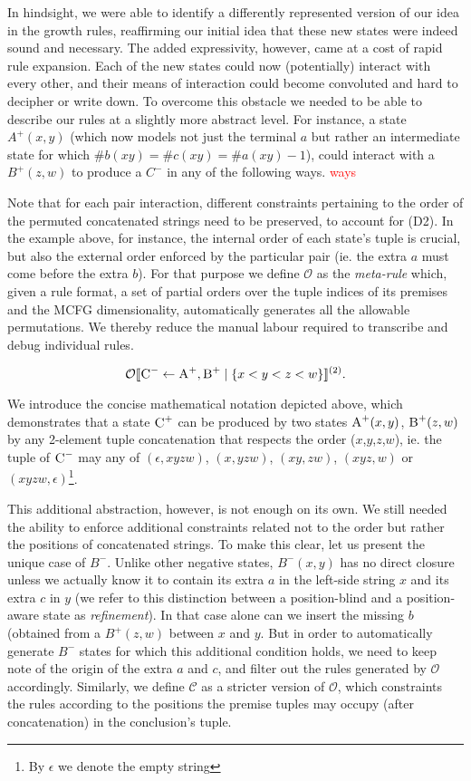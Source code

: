 \documentclass[nonatbib,numbers,10pt]{sigplanconf}
\newcommand\todo[1]{\textcolor{red}{#1}}
\newcommand\s{\textsc}
\newcommand{\Order}[5]{
	\[
	\mathcal{#1}\llbracket #2 \leftarrow #3 \mid \{ #4 \} \rrbracket^{(#5)}.
	\]
}
\newcommand{\Ord}[4]{\Order{O}{#1}{#2}{#3}{#4}}
\begin{document}
In hindsight, we were able to identify a differently represented version of our idea in the growth rules, reaffirming our initial idea that these new states were indeed sound and necessary. The added expressivity, however, came at a cost of rapid rule expansion. Each of the new states could now (potentially) interact with every other, and their means of interaction could become convoluted and hard to decipher or write down. To overcome this obstacle we needed to be able to describe our rules at a slightly more abstract level. For instance, a state $A^{+}(x,y)$ (which now models not just the terminal $a$ but rather an intermediate state for which $ \# b(xy) = \# c(xy) = \# a(xy)-1$), could interact with a $B^{+}(z,w)$ to produce a $C^{-}$ in any of the following ways.
\todo{ways}

Note that for each pair interaction, different constraints pertaining to the order of the permuted concatenated strings need to be preserved, to account for (D2). In the example above, for instance, the internal order of each state's tuple is crucial, but also the external order enforced by the particular pair (ie. the extra $a$ must come before the extra $b$). For that purpose we define $\mathcal{O}$ as the \textit{meta-rule} which, given a rule format, a set of partial orders over the tuple indices of its premises and the MCFG dimensionality, automatically generates all the allowable permutations. We thereby reduce the manual labour required to transcribe and debug individual rules.

\Ord{\s{C}^-}{\s{A}^+, \s{B}^+}{x < y < z < w}{2}

We introduce the concise mathematical notation depicted above, which demonstrates that a state $\textsc{C}^{+}$ can be produced by two states $\textsc{A}^{+}(x,y)$, $\textsc{B}^{+}(z,w)$ by any 2-element tuple concatenation that respects the order ($x$,$y$,$z$,$w$), ie. the tuple of $\textsc{C}^{-}$ may any of $(\epsilon, xyzw)$, $(x, yzw)$, $(xy,zw)$, $(xyz,w)$ or $(xyzw, \epsilon)$\footnote{By $\epsilon$ we denote the empty string}.

This additional abstraction, however, is not enough on its own. We still needed the ability to enforce additional constraints related not to the order but rather the positions of concatenated strings. To make this clear, let us present the unique case of $B^{-}$. Unlike other negative states, $B^{-}(x,y)$ has no direct closure unless we actually know it to contain its extra $a$ in the left-side string $x$ and its extra $c$ in $y$ (we refer to this distinction between a position-blind and a position-aware state as \textit{refinement}). In that case alone can we insert the missing $b$ (obtained from a $B^{+}(z,w)$ between $x$ and $y$. But in order to automatically generate $B^{-}$ states for which this additional condition holds, we need to keep note of the origin of the extra $a$ and $c$, and filter out the rules generated by $\mathcal{O}$ accordingly. Similarly, we define $\mathcal{C}$ as a stricter version of $\mathcal{O}$, which constraints the rules according to the positions the premise tuples may occupy (after concatenation) in the conclusion's tuple.
\end{document}
